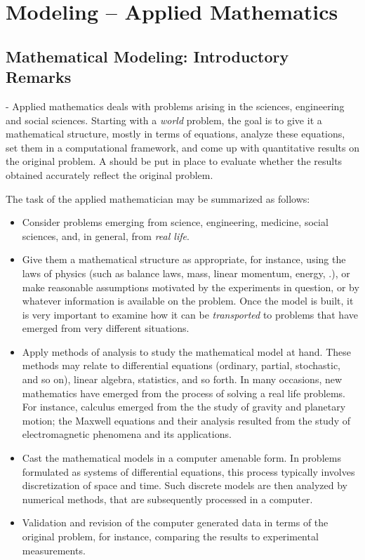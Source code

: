\section{Modeling -- Applied Mathematics}


\subsection{Mathematical Modeling: Introductory Remarks}-
Applied mathematics deals with problems arising in the sciences, engineering and social sciences. Starting with a \emph{world} problem, the goal is to give it a mathematical structure, mostly in terms of equations, analyze these equations, set them in a computational framework, and come up with quantitative results on the original problem. A  should be put in place to evaluate whether the results obtained accurately reflect the original problem.

The task of the applied mathematician may be summarized as follows:
\begin{itemize}
\item Consider problems emerging from science, engineering, medicine, social sciences, and, in general, from \emph{real life}.
%
\item Give them a mathematical structure as appropriate, for instance, using the laws of physics (such as balance laws, mass, linear momentum, energy, \etc.), or make reasonable assumptions motivated by the experiments in question, or by whatever information is available on the problem. Once the model is built, it is very important to examine how it can be \emph{transported} to problems that have emerged from very different situations.
%
\item Apply methods of analysis to study the mathematical model at hand. These methods may relate to differential equations (ordinary, partial, stochastic, and so on), linear algebra, statistics, and so forth. In many occasions, new mathematics have emerged from the process of solving a real life problems. For instance, calculus emerged from the the study of gravity and planetary motion; the Maxwell equations and their analysis resulted from the study of electromagnetic phenomena and its applications.
%
\item Cast the mathematical models in a computer amenable form. In problems formulated as systems of differential equations, this process typically involves discretization of space and time. Such discrete models are then analyzed by numerical methods, that are subsequently processed in a computer.
%
\item Validation and revision of the computer generated data in terms of the original problem, for instance, comparing the results to experimental measurements.
\end{itemize}

